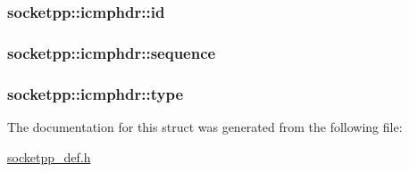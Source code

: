 \hypertarget{structsocketpp_1_1icmphdr_a149822bbb52234fb048c83c9bed9189}{
\subsubsection[{id}]{ {\bf socketpp::icmphdr::id}}}
\label{structsocketpp_1_1icmphdr_a149822bbb52234fb048c83c9bed9189}


\hypertarget{structsocketpp_1_1icmphdr_e696676883b273ad81a70ccff1549ce8}{
\subsubsection[{sequence}]{ {\bf socketpp::icmphdr::sequence}}}
\label{structsocketpp_1_1icmphdr_e696676883b273ad81a70ccff1549ce8}


\hypertarget{structsocketpp_1_1icmphdr_f73226605c96acf2bc9ae861d45adf52}{
\subsubsection[{type}]{ {\bf socketpp::icmphdr::type}}}
\label{structsocketpp_1_1icmphdr_f73226605c96acf2bc9ae861d45adf52}




The documentation for this struct was generated from the following file:\begin{CompactItemize}
\item 
\hyperlink{socketpp__def_8h}{socketpp\_\-def.h}\end{CompactItemize}
